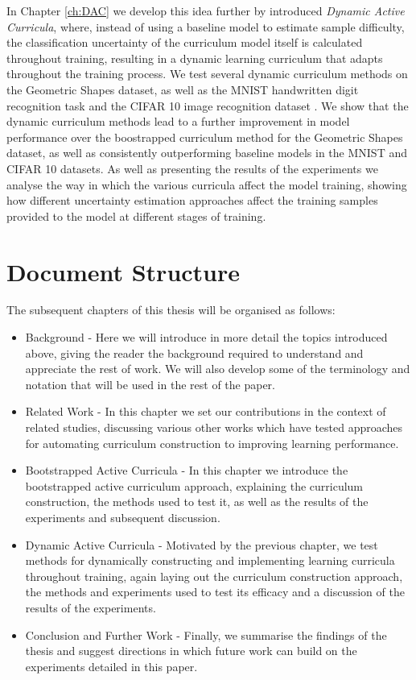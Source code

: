 In Chapter \ref{ch:DAC} we develop this idea further by introduced \textit{Dynamic Active Curricula}, where, instead of using a baseline model to estimate sample difficulty, the classification uncertainty of the curriculum model itself is calculated throughout training, resulting in a dynamic learning curriculum that adapts throughout the training process. We test several dynamic curriculum methods on the Geometric Shapes dataset, as well as the MNIST handwritten digit recognition task \cite{lecun-mnisthandwrittendigit-2010} and the CIFAR 10 image recognition dataset \cite{krizhevsky2009learning}. We show that the dynamic curriculum methods lead to a further improvement in model performance over the boostrapped curriculum method for the Geometric Shapes dataset, as well as consistently outperforming baseline models in the MNIST and CIFAR 10 datasets. As well as presenting the results of the experiments we analyse the way in which the various curricula affect the model training, showing how different uncertainty estimation approaches affect the training samples provided to the model at different stages of training.



\section{Document Structure}
The subsequent chapters of this thesis will be organised as follows:
\begin{itemize}
\item Background - Here we will introduce in more detail the topics introduced above, giving the reader the background required to understand and appreciate the rest of work. We will also develop some of the terminology and notation that will be used in the rest of the paper.
\item Related Work - In this chapter we set our contributions in the context of related studies, discussing various other works which have tested approaches for automating curriculum construction to improving learning performance.
\item Bootstrapped Active Curricula - In this chapter we introduce the bootstrapped active curriculum approach, explaining the curriculum construction, the methods used to test it, as well as the results of the experiments and subsequent discussion.
\item Dynamic Active Curricula - Motivated by the previous chapter, we test methods for dynamically constructing and implementing learning curricula throughout training, again laying out the curriculum construction approach, the methods and experiments used to test its efficacy and a discussion of the results of the experiments.
\item Conclusion and Further Work - Finally, we summarise the findings of the thesis and suggest directions in which future work can build on the experiments detailed in this paper.
\end{itemize}
